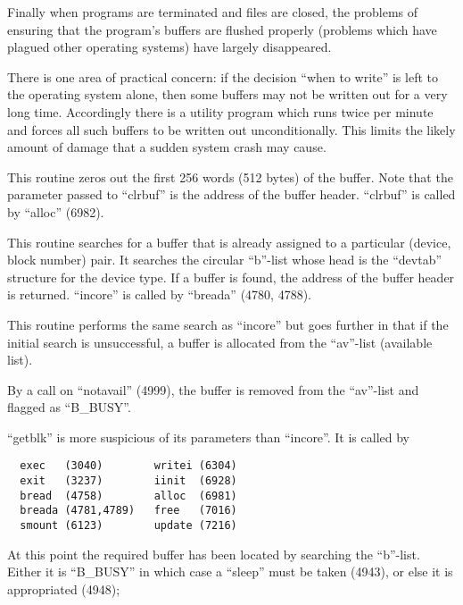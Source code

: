Finally when programs are terminated
and files are closed, the problems of
ensuring that the program's buffers are
flushed properly (problems which have
plagued other operating systems) have
largely disappeared.

There is one area of practical concern:
if the decision ``when to write'' is left
to the operating system alone, then
some buffers may not be written out for
a very long time. Accordingly there is
a utility program which runs twice per
minute and forces all such buffers to
be written out unconditionally. This
limits the likely amount of damage that
a sudden system crash may cause.



This routine zeros out the first 256
words (512 bytes) of the buffer. Note
that the parameter passed to ``clrbuf''
is the address of the buffer header.
``clrbuf'' is called by ``alloc'' (6982).


This routine searches for a buffer that
is already assigned to a particular
(device, block number) pair. It
searches the circular ``b''-list whose
head is the ``devtab'' structure for the
device type. If a buffer is found, the
address of the buffer header is
returned. ``incore'' is called by
``breada'' (4780, 4788).


This routine performs the same search
as ``incore'' but goes further in that if
the initial search is unsuccessful, a
buffer is allocated from the ``av''-list
(available list).

By a call on ``notavail'' (4999), the
buffer is removed from the ``av''-list
and flagged as ``B\_BUSY''.



``getblk'' is more suspicious of its
parameters than ``incore''. It is called
by

\begin{verbatim}
  exec   (3040)        writei (6304)
  exit   (3237)        iinit  (6928)
  bread  (4758)        alloc  (6981)
  breada (4781,4789)   free   (7016)
  smount (6123)        update (7216)
\end{verbatim}


\bd
\item[4940:] At this point the required buffer
 has been located by searching the
 ``b''-list. Either it is ``B\_BUSY''
 in which case a ``sleep'' must be
 taken (4943), or else it is
 appropriated (4948);

